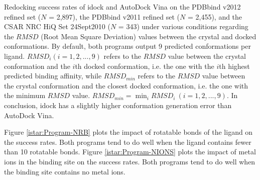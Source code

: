 \begin{table}
\begin{flushleft}
\label{istar:RedockingSuccessRate} Redocking success rates of idock and AutoDock Vina on the PDBbind v2012 refined set ($N$ = 2,897), the PDBbind v2011 refined set ($N$ = 2,455), and the CSAR NRC HiQ Set 24Sept2010 ($N$ = 343) under various conditions regarding the $RMSD$ (Root Mean Square Deviation) values between the crystal and docked conformations. By default, both programs output 9 predicted conformations per ligand. $RMSD_i (i = 1,2,...,9)$ refers to the $RMSD$ value between the crystal conformation and the $i$th docked conformation, i.e. the one with the $i$th highest predicted binding affinity, while $RMSD_{min}$ refers to the $RMSD$ value between the crystal conformation and the closest docked conformation, i.e. the one with the minimum $RMSD$ value. $RMSD_{min} = \displaystyle\min_{i}RMSD_i\ (i = 1,2,...,9)$. In conclusion, idock has a slightly higher conformation generation error than AutoDock Vina.
\end{flushleft}
\end{table}

Figure \ref{istar:Program-NRB} plots the impact of rotatable bonds of the ligand on the success rates. Both programs tend to do well when the ligand contains fewer than 10 rotatable bonds. Figure \ref{istar:Program-NIONS} plots the impact of metal ions in the binding site on the success rates. Both programs tend to do well when the binding site contains no metal ions.

